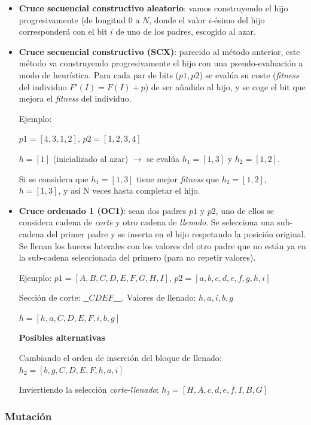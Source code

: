 \documentclass[12pt]{article}
\begin{document}
\begin{itemize}
    \item \textbf{Cruce secuencial constructivo aleatorio}: vamos construyendo el hijo progresivamente (de longitud $0$ a $N$, donde el valor $i$-ésimo del hijo corresponderá con el bit $i$ de uno de los padres, escogido al azar.
    \item \textbf{Cruce secuencial constructivo (SCX)}: parecido al método anterior, este método va construyendo progresivamente el hijo con una pseudo-evaluación a modo de heurística. Para cada par de bits ($p1, p2$) se evalúa su coste (\emph{fitness} del individuo $F'(I)=F(I)+p$) de ser añadido al hijo, y se coge el bit que mejora el \emph{fitness} del individuo.

    Ejemplo: 
    
    $p1=[4,3,1,2]$, $p2=[1,2,3,4]$
    
    $h =[1]$ (inicializado al azar) $\rightarrow$ se evalúa $h_1=[1,3]$ y $h_2=[1,2]$. 
    
    Si se considera que $h_1=[1,3]$ tiene mejor \emph{fitness} que $h_2=[1,2]$, $h=[1,3]$, y así N veces hasta completar el hijo.

    \item \textbf{Cruce ordenado 1 (OC1)}: sean dos padres $p1$ y $p2$, uno de ellos se considera cadena de \emph{corte} y otro cadena de \emph{llenado}. Se selecciona una sub-cadena del primer padre y se inserta en el hijo respetando la posición original. Se llenan los huecos laterales con los valores del otro padre que no están ya en la sub-cadena seleccionada del primero (para no repetir valores).

    Ejemplo:
    $p1=[A,B,C,D,E,F,G,H,I]$, $p2=[a,b,c,d,e,f,g,h,i]$
    
    Sección de corte: $\_ \_ CDEF \_ \_ \_$. Valores de llenado: $h,a,i,b,g$
    
    $h=[h, a, C, D, E, F, i, b, g]$
    
    \textbf{Posibles alternativas}
    
    \subitem Cambiando el orden de inserción del bloque de llenado: $h_2=[b, g, C, D, E, F, h, a, i]$
    
    \subitem Inviertiendo la selección \emph{corte}-\emph{llenado}: $h_3=[H, A, c, d, e, f, I, B, G]$
    
\end{itemize}


\subsubsection{Mutación}
\end{document}
